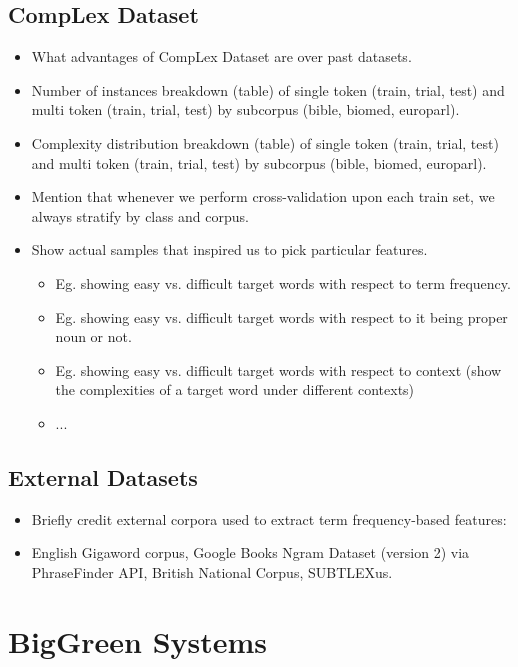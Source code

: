 \documentclass[11pt,a4paper]{article}
\begin{document}
\subsection{CompLex Dataset}

\begin{itemize}
  \item What advantages of CompLex Dataset are over past datasets.
  \item Number of instances breakdown (table) of single token (train, trial, test) and multi token (train, trial, test) by subcorpus (bible, biomed, europarl).
  \item Complexity distribution breakdown (table) of single token (train, trial, test) and multi token (train, trial, test) by subcorpus (bible, biomed, europarl).
  \item Mention that whenever we perform cross-validation upon each train set, we always stratify by class and corpus.
  \item Show actual samples that inspired us to pick particular features. 
  \begin{itemize}
    \item Eg. showing easy vs. difficult target words with respect to term frequency.
    \item Eg. showing easy vs. difficult target words with respect to it being proper noun or not.
    \item Eg. showing easy vs. difficult target words with respect to context (show the complexities of a target word under different contexts)
    \item ...
  \end{itemize}
\end{itemize}

\subsection{External Datasets}

\begin{itemize}
  \item Briefly credit external corpora used to extract term frequency-based features:
  \item English Gigaword corpus, Google Books Ngram Dataset (version 2) via PhraseFinder API, British National Corpus, SUBTLEXus.
\end{itemize}

\section{BigGreen Systems}
\end{document}
